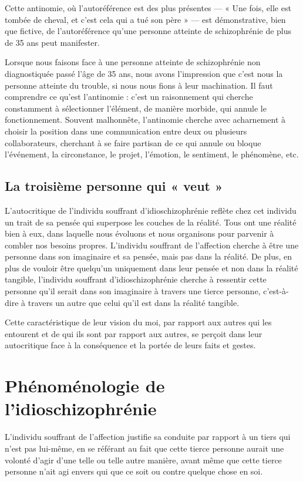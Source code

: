 \documentclass[12pt,oneside]{article}
\begin{document}
Cette antinomie, où l'autoréférence est des plus présentes --- « Une fois, elle est tombée de cheval, et c'est cela qui a tué son père » --- est démonstrative, bien que fictive, de l'autoréférence qu'une personne atteinte de schizophrénie de plus de 35 ans peut manifester.

Lorsque nous faisons face à une personne atteinte de schizophrénie non diagnostiquée passé l'âge de 35 ans, nous avons l'impression que c'est nous la personne atteinte du trouble, si nous nous fions à leur machination. Il faut comprendre ce qu'est l'antinomie : c'est un raisonnement qui cherche constamment à sélectionner l'élément, de manière morbide, qui annule le fonctionnement. Souvent malhonnête, l'antinomie cherche avec acharnement à choisir la position dans une communication entre deux ou plusieurs collaborateurs, cherchant à se faire partisan de ce qui annule ou bloque l'événement, la circonstance, le projet, l'émotion, le sentiment, le phénomène, etc.

\subsection{La troisième personne qui « veut »}

L'autocritique de l'individu souffrant d'idioschizophrénie reflète chez cet individu un trait de sa pensée qui superpose les couches de la réalité. Tous ont une réalité bien à eux, dans laquelle nous évoluons et nous organisons pour parvenir à combler nos besoins propres. L'individu souffrant de l'affection cherche à être une personne dans son imaginaire et sa pensée, mais pas dans la réalité. De plus, en plus de vouloir être quelqu'un uniquement dans leur pensée et non dans la réalité tangible, l'individu souffrant d'idioschizophrénie cherche à ressentir cette personne qu'il serait dans son imaginaire à travers une tierce personne, c'est-à-dire à travers un autre que celui qu'il est dans la réalité tangible.

Cette caractéristique de leur vision du moi, par rapport aux autres qui les entourent et de qui ils sont par rapport aux autres, se perçoit dans leur autocritique face à la conséquence et la portée de leurs faits et gestes.

\section{Phénoménologie de l'idioschizophrénie}

L'individu souffrant de l'affection justifie sa conduite par rapport à un tiers qui n'est pas lui-même, en se référant au fait que cette tierce personne aurait une volonté d'agir d'une telle ou telle autre manière, avant même que cette tierce personne n'ait agi envers qui que ce soit ou contre quelque chose en soi.
\end{document}
